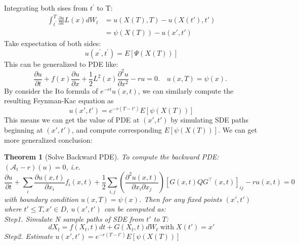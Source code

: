 \documentclass{article}
\newtheorem{theorem}{Theorem}
\begin{document}
Integrating both sises from $t^{\prime}$  to  T:
\begin{equation}
    \begin{aligned}
        \int_{t^{\prime}}^{T} \frac{\partial u}{\partial x} L(x) d W_{t} &= u(X(T), T) - u(X(t'), t')\\
        &= \psi(X(T)) - u(x', t')
    \end{aligned}
\end{equation}
Take expectation of both sides:
\begin{equation}
    u\left(x^{\prime}, t^{\prime}\right)=E[\Psi(X(T))]
\end{equation}  
This can be generalized to PDE like:
\begin{equation}
    \frac{\partial u}{\partial t}+f(x) \frac{\partial u}{\partial x}+\frac{1}{2} L^{2}(x) \frac{\partial^{2} u}{\partial x^{2}}-r u=0 . \quad u(x, T)=\psi(x) \text {. }
\end{equation}
By consider the Ito formula of $e^{-rt}u(x, t)$, we can similarly compute the resulting Feynman-Kac equation as 
\begin{equation}
    u(x', t') = e^{-r(T-t')}E\left[\psi(X(T))\right]
\end{equation}
This means we can get the value of PDE at $(x', t')$ by simulating SDE paths beginning at $(x', t')$, and compute corresponding $E\left[\psi(X(T))\right]$. We can get more generalized conclusion:
\begin{theorem}[Solve Backward PDE]

    To compute the backward PDE: $(\mathcal{A}_t-r)(u)=0$, i.e.
    \begin{equation}
        \frac{\partial u}{\partial t} + \sum_{i} \frac{\partial u(x, t)}{\partial x_{i}} f_{i}(x, t)+\frac{1}{2} \sum_{i, j}\left(\frac{\partial^{2}u(x, t)}{\partial x_{i} \partial x_{j}}\right)\left[G(x, t)Q G^{\top}(x, t)\right]_{i j} - ru(x, t)=0
    \end{equation}
    with boundary condition $u(x, T)=\psi(x)$. Then for any fixed points $(x', t')$ where $t'\leq T, x'\in D$, $u(x', t')$ can be computed as:\\
    Step1. Simulate N sample paths of SDE from $t'$ to $T$:
    \begin{equation}
        dX_t=f(X_t, t)dt + G(X_t, t)dW_t\operatorname{with}X(t')=x'
    \end{equation}
    Step2. Estimate $u(x', t') = e^{-r(T-t')}E\left[\psi(X(T))\right]$
\end{theorem}
\end{document}
